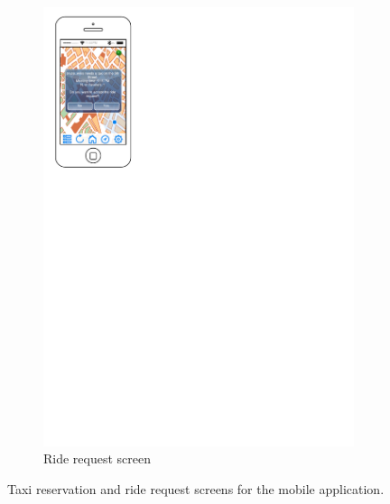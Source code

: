 \begin{figure}
\begin{subfigure}{0.45\textwidth}
        \includegraphics[width=\textwidth]{mockup/app/RideRequest}
        \caption{Ride request screen}
        \label{fig:mockup-riderequest-mobile}
    \end{subfigure}
    \caption{Taxi reservation and ride request screens for the mobile application.}
\end{figure}
